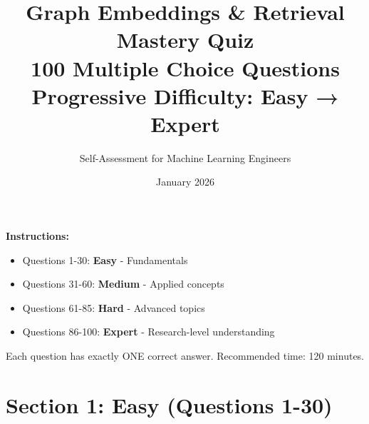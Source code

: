 \documentclass[12pt,a4paper]{article}
\title{\Huge\textbf{Graph Embeddings \& Retrieval}\\[0.3cm]
\LARGE Mastery Quiz\\[0.5cm]
\Large 100 Multiple Choice Questions\\[0.3cm]
\normalsize Progressive Difficulty: Easy → Expert}
\author{Self-Assessment for Machine Learning Engineers}
\date{January 2026}
\begin{document}
\maketitle
\thispagestyle{empty}

\vspace{1cm}

\begin{center}
\begin{tcolorbox}[width=0.8\textwidth,colback=gray!5,colframe=gray!50]
\textbf{Instructions:}
\begin{itemize}
    \item Questions 1-30: \textcolor{easy}{\textbf{Easy}} - Fundamentals
    \item Questions 31-60: \textcolor{medium}{\textbf{Medium}} - Applied concepts
    \item Questions 61-85: \textcolor{hard}{\textbf{Hard}} - Advanced topics
    \item Questions 86-100: \textcolor{hard}{\textbf{Expert}} - Research-level understanding
\end{itemize}
Each question has exactly ONE correct answer. Recommended time: 120 minutes.
\end{tcolorbox}
\end{center}

\newpage

\section*{\textcolor{easy}{Section 1: Easy (Questions 1-30)}}
\end{document}
